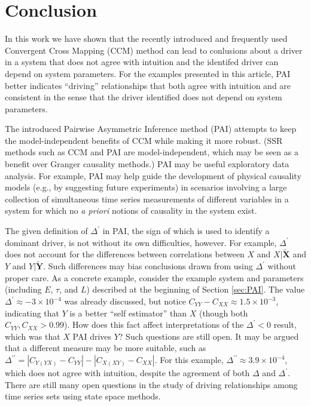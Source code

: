 \documentclass[twocolumn,aps,pre,groupedaddress]{revtex4-1}
\begin{document}
\section{Conclusion}

In this work we have shown that the recently introduced and frequently used Convergent Cross Mapping (CCM) method can lead to conlusions about a driver in a system that does not agree with intuition and the identifed driver can depend on system parameters.  For the examples presented in this article, PAI better indicates ``driving'' relationships that both agree with intuition and are consistent in the sense that the driver identified does not depend on system parameters.  

The introduced Pairwise Asymmetric Inference method (PAI) attempts to keep the model-independent benefits of CCM while making it more robust. (SSR methods such as CCM and PAI are model-independent, which may be seen as a benefit over Granger causality methods.) PAI may be useful exploratory data analysis.  For example, PAI may help guide the development of physical causality models (e.g., by suggesting future experiments) in scenarios involving a large collection of simultaneous time series measurements of different variables in a system for which no {\em a priori} notions of causality in the system exist. 

The given definition of $\Delta^\prime$ in PAI, the sign of which is used to identify a dominant driver, is not without its own difficulties, however.  For example, $\Delta^\prime$ does not account for the differences between correlations between $X$ and $X|\tilde{\mathbf{X}}$ and $Y$ and $Y|\tilde{\mathbf{Y}}$.  Such differences may bias conclusions drawn from using $\Delta^\prime$ without proper care.  As a concrete example, consider the example system and parameters (including $E$, $\tau$, and $L$) described at the beginning of Section \ref{sec:PAI}.  The value $\Delta^\prime \approx -3\times 10^{-4}$ was already discussed, but notice $C_{YY}-C_{XX} \approx 1.5\times10^{-3}$, indicating that $Y$ is a better ``self estimator'' than $X$ (though both $C_{YY},C_{XX}>0.99$).  How does this fact affect interpretations of the $\Delta^\prime<0$ result, which was that $X$ PAI drives $Y$?  Such questions are still open.  It may be argued that a different measure may be more suitable, such as $\Delta^{\prime\prime} = |C_{Y(YX)}-C_{YY}|-|C_{X(XY)}-C_{XX}|$.  For this example, $\Delta^{\prime\prime} \approx 3.9\times 10^{-4}$, which does not agree with intuition, despite the agreement of both $\Delta$ and $\Delta^\prime$.  There are still many open questions in the study of driving relationships among time series sets using state space methods.
\end{document}
